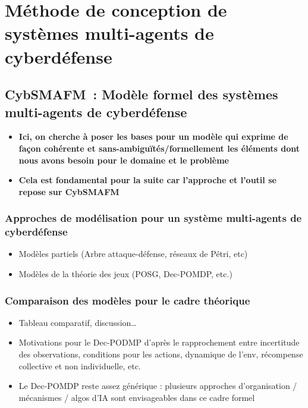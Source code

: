\chapter{Méthode de conception de systèmes multi-agents de cyberdéfense}\label{ch:cybSMAdm} %

\section{CybSMAFM : Modèle formel des systèmes multi-agents de cyberdéfense}\label{sec:cybSMAfm}

\begin{itemize}
    \item \textbf{Ici, on cherche à poser les bases pour un modèle qui exprime de façon cohérente et sans-ambiguïtés/formellement les éléments dont nous avons besoin pour le domaine et le problème}
    \item \textbf{Cela est fondamental pour la suite car l'approche et l'outil se repose sur CybSMAFM}
\end{itemize}

\subsection{Approches de modélisation pour un système multi-agents de cyberdéfense}
\begin{itemize}

    \item Modèles partiels (Arbre attaque-défense, réseaux de Pétri, etc)
    \item Modèles de la théorie des jeux (POSG, Dec-POMDP, etc.)
\end{itemize}

\subsection{Comparaison des modèles pour le cadre théorique}
\begin{itemize}

    \item Tableau comparatif, discussion…
    \item Motivations pour le Dec-PODMP d'après le rapprochement entre incertitude des observations, conditions pour les actions, dynamique de l'env, récompense collective et non individuelle, etc.
    \item Le Dec-POMDP reste assez générique : plusieurs approches d'organisation / mécanismes / algos d'IA sont envisageables dans ce cadre formel
\end{itemize}

